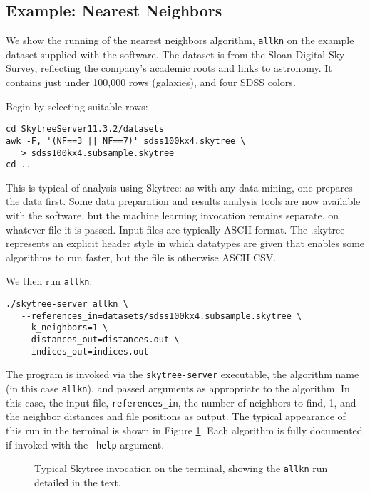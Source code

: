 \subsection{Example: Nearest Neighbors}

We show the running of the nearest neighbors algorithm, {\tt allkn} on the example dataset supplied with the software. The dataset is from the Sloan Digital Sky Survey, reflecting the company's academic roots and links to astronomy. It contains just under 100,000 rows (galaxies), and four SDSS colors.

Begin by selecting suitable rows:

\begin{verbatim}
cd SkytreeServer11.3.2/datasets
awk -F, '(NF==3 || NF==7)' sdss100kx4.skytree \
   > sdss100kx4.subsample.skytree
cd ..
\end{verbatim}

This is typical of analysis using Skytree: as with any data mining, one prepares the data first. Some data preparation and results analysis tools are now available with the software, but the machine learning invocation remains separate, on whatever file it is passed. Input files are typically ASCII format. The .skytree represents an explicit header style in which datatypes are given that enables some algorithms to run faster, but the file is otherwise ASCII CSV.

We then run {\tt allkn}:

\begin{verbatim}
./skytree-server allkn \
   --references_in=datasets/sdss100kx4.subsample.skytree \
   --k_neighbors=1 \
   --distances_out=distances.out \
   --indices_out=indices.out
\end{verbatim}

The program is invoked via the {\tt skytree-server} executable, the algorithm name (in this case {\tt allkn}), and passed arguments as appropriate to the algorithm. In this case, the input file, {\tt references\_in}, the number of neighbors to find, 1, and the neighbor distances and file positions as output. The typical appearance of this run in the terminal is shown in Figure \ref{Fig: Terminal}. Each algorithm is fully documented if invoked with the {\tt --help} argument.

\begin{figure}
\caption{Typical Skytree invocation on the terminal, showing the {\tt allkn} run detailed in the text. \label{Fig: Terminal}}
\end{figure}

